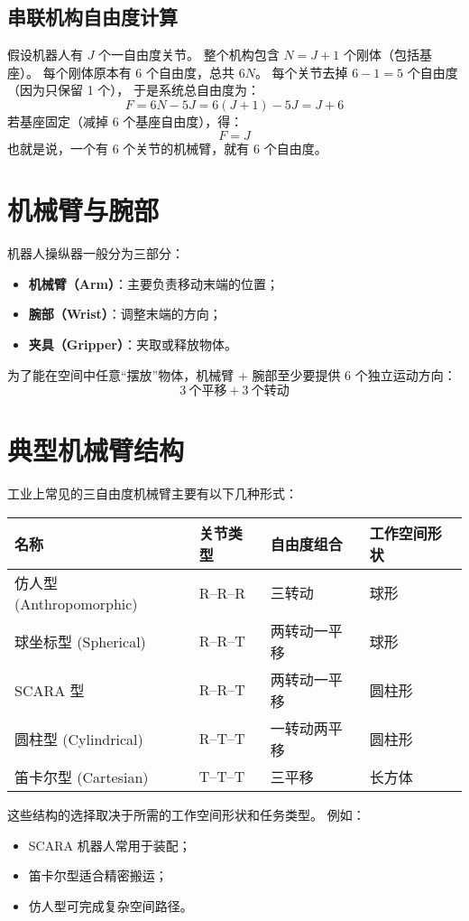 \documentclass[12pt,a4paper]{article}
\begin{document}
\subsection{串联机构自由度计算}
假设机器人有 $J$ 个一自由度关节。  
整个机构包含 $N=J+1$ 个刚体（包括基座）。  
每个刚体原本有 6 个自由度，总共 \(6N\)。  
每个关节去掉 \(6-1=5\) 个自由度（因为只保留 1 个），  
于是系统总自由度为：
\[
F = 6N - 5J = 6(J+1) - 5J = J + 6
\]
若基座固定（减掉 6 个基座自由度），得：
\[
\boxed{F = J}
\]
也就是说，一个有 6 个关节的机械臂，就有 6 个自由度。

\section{机械臂与腕部}
机器人操纵器一般分为三部分：

\begin{itemize}
  \item \textbf{机械臂（Arm）}：主要负责移动末端的位置；
  \item \textbf{腕部（Wrist）}：调整末端的方向；
  \item \textbf{夹具（Gripper）}：夹取或释放物体。
\end{itemize}

为了能在空间中任意“摆放”物体，机械臂 + 腕部至少要提供 6 个独立运动方向：
\[
3\ \text{个平移} + 3\ \text{个转动}
\]

\section{典型机械臂结构}
工业上常见的三自由度机械臂主要有以下几种形式：

\begin{table}[h!]
\centering
\begin{tabular}{llll}
\toprule
名称 & 关节类型 & 自由度组合 & 工作空间形状 \\
\midrule
仿人型 (Anthropomorphic) & R–R–R & 三转动 & 球形 \\
球坐标型 (Spherical) & R–R–T & 两转动一平移 & 球形 \\
SCARA 型 & R–R–T & 两转动一平移 & 圆柱形 \\
圆柱型 (Cylindrical) & R–T–T & 一转动两平移 & 圆柱形 \\
笛卡尔型 (Cartesian) & T–T–T & 三平移 & 长方体 \\
\bottomrule
\end{tabular}
\end{table}

这些结构的选择取决于所需的工作空间形状和任务类型。  
例如：
\begin{itemize}
  \item SCARA 机器人常用于装配；
  \item 笛卡尔型适合精密搬运；
  \item 仿人型可完成复杂空间路径。
\end{itemize}
\end{document}
